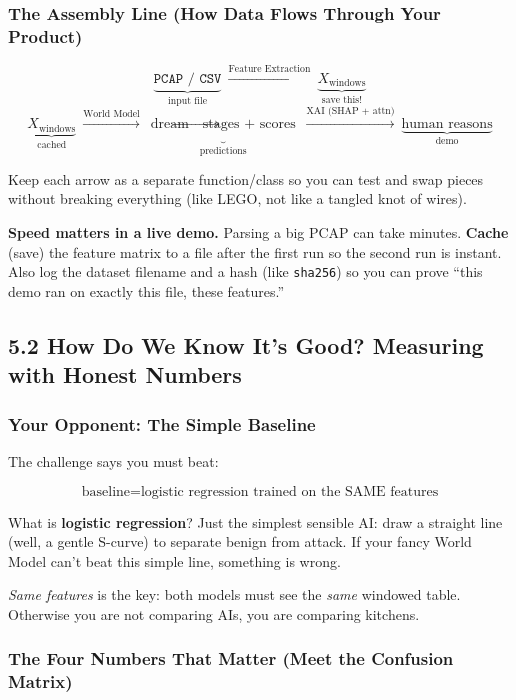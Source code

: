 \documentclass[11pt,a4paper]{article}
\begin{document}
\subsubsection{The Assembly Line (How Data Flows Through Your Product)}

\[
\underbrace{\texttt{PCAP / CSV}}_{\text{input file}}
\ \xrightarrow{\text{Feature Extraction}}\ 
\underbrace{X_{\text{windows}}}_{\text{save this!}}
\]
\[
\underbrace{X_{\text{windows}}}_{\text{cached}} \ \xrightarrow{\text{World Model}}\ 
\underbrace{\text{dream} \to \text{stages + scores}}_{\text{predictions}}
\ \xrightarrow{\text{XAI (SHAP + attn)}}\ 
\underbrace{\text{human reasons}}_{\text{demo}}
\]

Keep each arrow as a separate function/class so you can test and swap pieces
without breaking everything (like LEGO, not like a tangled knot of wires).

\begin{tipbox}
\textbf{Speed matters in a live demo.} Parsing a big PCAP can take minutes.
\textbf{Cache} (save) the feature matrix to a file after the first run so the
second run is instant. Also log the dataset filename and a hash (like
\texttt{sha256}) so you can prove ``this demo ran on exactly this file,
these features.''
\end{tipbox}

\subsection{5.2 How Do We Know It's Good? Measuring with Honest Numbers}
\label{sec:benchmark}

\subsubsection{Your Opponent: The Simple Baseline}

The challenge says you must beat:

\[
\text{baseline} = \text{logistic regression trained on the SAME features}
\]

What is \textbf{logistic regression}? Just the simplest sensible AI: draw a
straight line (well, a gentle S-curve) to separate benign from attack. If your
fancy World Model can't beat this simple line, something is wrong.

\emph{Same features} is the key: both models must see the \emph{same} windowed
table. Otherwise you are not comparing AIs, you are comparing kitchens.

\subsubsection{The Four Numbers That Matter (Meet the Confusion Matrix)}
\end{document}
